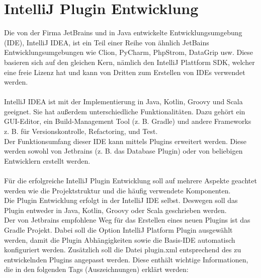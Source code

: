 \section{IntelliJ Plugin Entwicklung}
Die von der Firma JetBrains und in Java entwickelte Entwicklungsumgebung (IDE), IntelliJ IDEA, ist ein Teil einer Reihe von ähnlich JetBains Entwicklungsumgebungen wie Clion, PyCharm, PhpStrom, DataGrip usw. Diese basieren sich auf den gleichen Kern, nämlich den IntelliJ Plattform SDK, welcher eine freie Lizenz hat und kann von Dritten zum Erstellen von IDEs verwendet werden.\\ \\
IntelliJ IDEA ist mit der Implementierung in Java, Kotlin, Groovy und Scala geeignet. Sie hat außerdem unterschiedliche Funktionalitäten. Dazu gehört ein GUI-Editor, ein Build-Management Tool (z. B. Gradle) und andere Frameworks z. B. für Versionskontrolle, Refactoring, und Test.\\
Der Funktionsumfang dieser IDE kann mittels Plugins erweitert werden. Diese werden sowohl von Jetbrains (z. B. das Database Plugin) oder von beliebigen Entwicklern erstellt werden. \\ \\
Für die erfolgreiche IntelliJ Plugin Entwicklung soll auf mehrere Aspekte geachtet werden wie die Projektstruktur und die häufig verwendete Komponenten.\\
Die Plugin Entwicklung erfolgt in der IntelliJ IDE selbst. Deswegen soll das Plugin entweder in Java, Kotlin, Groovy oder Scala geschrieben werden.\\
Der von Jetbrains empfohlene Weg für das Erstellen eines neuen Plugins ist das Gradle Projekt. Dabei soll die Option IntelliJ Platform Plugin ausgewählt werden, damit die Plugin Abhängigkeiten sowie die Basis-IDE automatisch konfiguriert werden. Zusätzlich soll die Datei plugin.xml entsprechend des zu entwickelnden Plugins angepasst werden. Diese enthält wichtige Informationen, die in den folgenden Tags (Auszeichnungen) erklärt werden:
